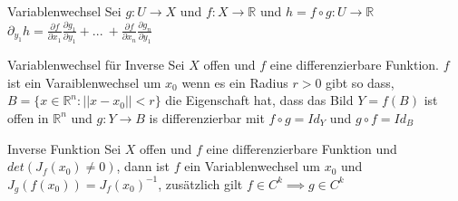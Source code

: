 \begin{Rezept}{Variablenwechsel}{}
    Sei $g: U \rightarrow X$ und $f: X \rightarrow \mathbb{R}$ und $h = f \circ g: U \rightarrow \mathbb{R}$\\
    $
    \partial_{y_1}h = \frac{\partial f}{\partial x_1}\frac{\partial g_1}{\partial y_1} + ... \ +  \frac{\partial f}{\partial x_n}\frac{\partial g_n}{\partial y_1}$
\end{Rezept}

\begin{Definition}{Variablenwechsel für Inverse}{}
    Sei $X$ offen und $f$ eine differenzierbare Funktion. $f$ ist ein Varaiblenwechsel um $x_0$ wenn es ein Radius $r > 0$ gibt so dass,
    $B = \{x \in \mathbb{R}^n: || x - x_0|| < r\}$ die Eigenschaft hat, dass das Bild $Y = f(B)$ ist offen in $\mathbb{R}^n$
    und $g: Y \rightarrow B$ is differenzierbar mit $f \circ g = Id_Y$ und $g \circ f = Id_B$
\end{Definition}

\begin{Satz}{Inverse Funktion}{}
    Sei $X$ offen und $f$ eine differenzierbare Funktion und $det(J_f(x_0) \neq 0)$, dann ist $f$ ein Variablenwechsel um $x_0$
    und $J_g(f(x_0)) = J_f(x_0)^{-1}$, zusätzlich gilt $f \in C^k \implies g \in C^k$
\end{Satz}